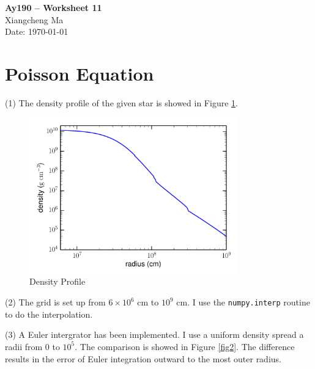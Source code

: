 \documentclass[11pt,letterpaper]{article}
\begin{document}
\begin{center}
\Large
{\bf Ay190 -- Worksheet 11} \\
\large
Xiangcheng Ma \\
Date: \today
\end{center}

\section*{Poisson Equation}
(1) The density profile of the given star is showed in Figure \ref{fig1}.

\begin{figure}[bth]
\centering
\includegraphics[width={0.8\textwidth}]{fig1.pdf} 
\caption{Density Profile}
\label{fig1}
\end{figure}

(2) The grid is set up from $6\times10^6$ cm to $10^9$ cm. I use the {\tt numpy.interp} routine to do the interpolation.

(3) A Euler intergrator has been implemented. I use a uniform density spread a radii from $0$ to $10^5$. The comparison is showed in Figure \ref{fig2}. The difference results in the error of Euler integration outward to the most outer radius. 
\end{document}
